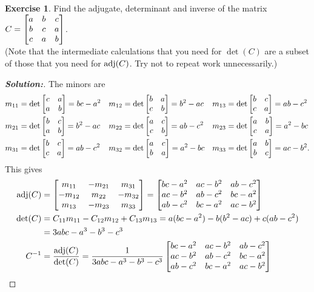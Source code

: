 \documentclass[a4paper]{amsart}
\theoremstyle{definition}
\newtheorem{exercise}{Exercise}
\newenvironment{solution}{\begin{proof}[\textbf{Solution:}] \vphantom{u}}{\end{proof}}
\begin{document}
\begin{exercise}\label{ex-adjugate-circulant}
 Find the adjugate, determinant and inverse of the matrix
 $C=\left[\begin{matrix} a & b & c \\
         b & c & a \\
         c & a & b \end{matrix}\right]$.  \\
 (Note that the intermediate calculations that you need for $\det(C)$
 are a subset of those that you need for $\operatorname{adj}(C)$.  Try not to repeat
 work unnecessarily.)
\end{exercise}
\begin{solution}
 The minors are 
 \begin{align*}
  m_{11} &= \det\left[\begin{matrix} c & a \\ a & b \end{matrix}\right] = bc-a^2 &
  m_{12} &= \det\left[\begin{matrix} b & a \\ c & b \end{matrix}\right] = b^2-ac &
  m_{13} &= \det\left[\begin{matrix} b & c \\ c & a \end{matrix}\right] = ab-c^2 \\
  m_{21} &= \det\left[\begin{matrix} b & c \\ a & b \end{matrix}\right] = b^2-ac &
  m_{22} &= \det\left[\begin{matrix} a & c \\ c & b \end{matrix}\right] = ab-c^2 &
  m_{23} &= \det\left[\begin{matrix} a & b \\ c & a \end{matrix}\right] = a^2-bc \\
  m_{31} &= \det\left[\begin{matrix} b & c \\ c & a \end{matrix}\right] = ab-c^2 &
  m_{32} &= \det\left[\begin{matrix} a & c \\ b & a \end{matrix}\right] = a^2-bc &
  m_{33} &= \det\left[\begin{matrix} a & b \\ b & c \end{matrix}\right] = ac-b^2. 
 \end{align*}
 This gives
 \begin{align*} 
  \operatorname{adj}(C) &= \left[\begin{matrix}  m_{11} & -m_{21} &  m_{31} \\
                  -m_{12} &  m_{22} & -m_{32} \\
                   m_{13} & -m_{23} &  m_{33} \end{matrix}\right] 
           = \left[\begin{matrix}  bc-a^2 & ac-b^2 & ab-c^2 \\
                   ac-b^2 & ab-c^2 & bc-a^2 \\
                   ab-c^2 & bc-a^2 & ac-b^2 \end{matrix}\right]
                   \\
  \det(C) &= C_{11}m_{11} - C_{12}m_{12} + C_{13}m_{13} 
           = a(bc-a^2) - b(b^2-ac) + c(ab-c^2) \\
          &= 3abc-a^3-b^3-c^3 \\
  C^{-1}  &= \frac{\operatorname{adj}(C)}{\det(C)} 
           = \frac{1}{3abc-a^3-b^3-c^3}
             \left[\begin{matrix}  bc-a^2 & ac-b^2 & ab-c^2 \\
                   ac-b^2 & ab-c^2 & bc-a^2 \\
                   ab-c^2 & bc-a^2 & ac-b^2 \end{matrix}\right]
 \end{align*}
\end{solution}
\end{document}
